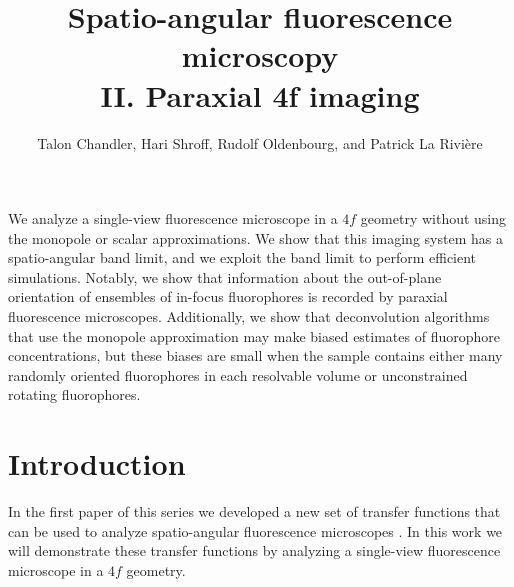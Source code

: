\documentclass[]{osa-article}
\begin{document}
\title{Spatio-angular fluorescence microscopy\\ II. Paraxial 4f imaging}

\author{Talon Chandler, Hari Shroff, Rudolf Oldenbourg, and Patrick La Rivi\`ere}

\address{University of Chicago, Department of Radiology, Chicago, Illinois 60637, USA\\
  Section on High Resolution Optical Imaging, National Institute
  of Biomedical Imaging and Bioengineering, National Institutes of Health,
  Bethesda, Maryland 20892, USA\\
  Marine Biological Laboratory, Bell Center, Woods Hole, Massachusetts 02543, USA
}




\begin{abstract*}
  We analyze a single-view fluorescence microscope in a $4f$ geometry
    without using the monopole or scalar approximations. We show that this
    imaging system has a spatio-angular band limit, and we exploit the band
    limit to perform efficient simulations. Notably, we show that information
    about the out-of-plane orientation of ensembles of in-focus fluorophores is
    recorded by paraxial fluorescence microscopes. Additionally, we show that
    deconvolution algorithms that use the monopole approximation may make biased
    estimates of fluorophore concentrations, but these biases are small when the
    sample contains either many randomly oriented fluorophores in each
    resolvable volume or unconstrained rotating fluorophores.
\end{abstract*}

\section{Introduction}
In the first paper of this series we developed a new set of transfer
  functions that can be used to analyze spatio-angular fluorescence microscopes
\cite{chandler2018}. In this work we will demonstrate these transfer
  functions by analyzing a single-view fluorescence microscope in a $4f$
  geometry.
\end{document}
